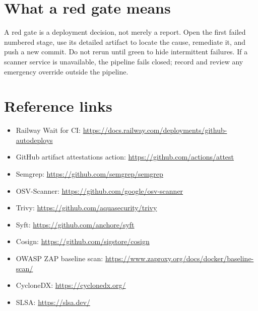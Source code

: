 \documentclass[11pt,a4paper]{article}
\begin{document}
\section{What a red gate means}

A red gate is a deployment decision, not merely a report. Open the first failed numbered stage, use its detailed artifact to locate the cause, remediate it, and push a new commit. Do not rerun until green to hide intermittent failures. If a scanner service is unavailable, the pipeline fails closed; record and review any emergency override outside the pipeline.

\section{Reference links}

\begin{itemize}
  \item Railway Wait for CI: \url{https://docs.railway.com/deployments/github-autodeploys}
  \item GitHub artifact attestations action: \url{https://github.com/actions/attest}
  \item Semgrep: \url{https://github.com/semgrep/semgrep}
  \item OSV-Scanner: \url{https://github.com/google/osv-scanner}
  \item Trivy: \url{https://github.com/aquasecurity/trivy}
  \item Syft: \url{https://github.com/anchore/syft}
  \item Cosign: \url{https://github.com/sigstore/cosign}
  \item OWASP ZAP baseline scan: \url{https://www.zaproxy.org/docs/docker/baseline-scan/}
  \item CycloneDX: \url{https://cyclonedx.org/}
  \item SLSA: \url{https://slsa.dev/}
\end{itemize}
\end{document}
